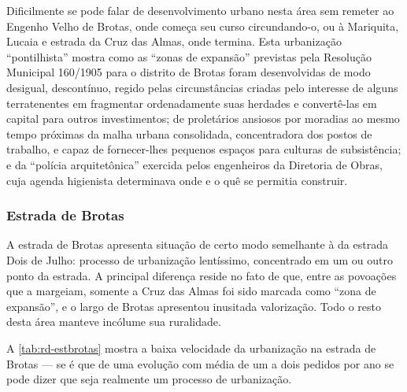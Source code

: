 Dificilmente se pode falar de desenvolvimento urbano nesta área sem remeter ao Engenho Velho de Brotas, onde começa seu curso circundando-o, ou à Mariquita, Lucaia e estrada da Cruz das Almas, onde termina. Esta urbanização ``pontilhista'' mostra como as ``zonas de expansão'' previstas pela Resolução Municipal 160/1905 para o distrito de Brotas foram desenvolvidas de modo desigual, descontínuo, regido pelas circunstâncias criadas pelo interesse de alguns terratenentes em fragmentar ordenadamente suas herdades e convertê-las em capital para outros investimentos; de proletários ansiosos por moradias ao mesmo tempo próximas da malha urbana consolidada, concentradora dos postos de trabalho, e capaz de fornecer-lhes pequenos espaços para culturas de subsistência; e da ``polícia arquitetônica'' exercida pelos engenheiros da Diretoria de Obras, cuja agenda higienista determinava onde e o quê se permitia construir.

\subsubsection{Estrada de Brotas}\label{subsubsec:estbrotas}


A estrada de Brotas apresenta situação de certo modo semelhante à da estrada Dois de Julho: processo de urbanização lentíssimo, concentrado em um ou outro ponto da estrada. A principal diferença reside no fato de que, entre as povoações que a margeiam, somente a Cruz das Almas foi sido marcada como ``zona de expansão'', e o largo de Brotas apresentou inusitada valorização. Todo o resto desta área manteve incólume sua ruralidade.

A \autoref{tab:rd-estbrotas} mostra a baixa velocidade da urbanização na estrada de Brotas --- se é que de uma evolução com média de um a dois pedidos por ano se pode dizer que seja realmente um processo de urbanização.

